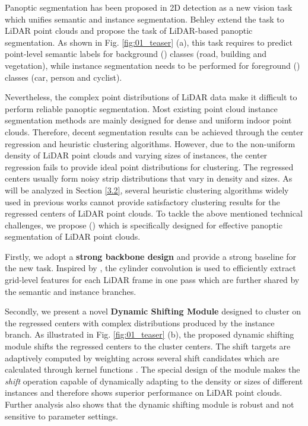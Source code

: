 \documentclass[final]{cvpr}
\begin{document}
Panoptic segmentation has been proposed in 2D detection \cite{kirillov2019panoptic} as a new vision task which unifies
semantic and instance segmentation.
Behley \etal \cite{behley2020benchmark} extend the task to LiDAR point clouds and propose the task of LiDAR-based panoptic segmentation.
As shown in Fig. \ref{fig:01_teaser} (a), this task requires to predict point-level semantic labels
for background (\stuff{}) classes (\eg road, building and vegetation),
while instance segmentation needs to be performed for foreground (\things{}) classes (\eg car, person and cyclist).

Nevertheless, the complex point distributions of LiDAR data make it difficult to perform reliable panoptic segmentation.
Most existing point cloud instance segmentation methods \cite{engelmann20203d, jiang2020pointgroup} are mainly designed for dense and uniform indoor point clouds.
Therefore, decent segmentation results can be achieved through the center regression and heuristic clustering algorithms.
However, due to the non-uniform density of LiDAR point clouds and varying sizes of instances,
the center regression fails to provide ideal point distributions for clustering.
The regressed centers usually form noisy strip distributions that vary in density and sizes.
As will be analyzed in Section \ref{3.2}, several heuristic clustering algorithms widely used in previous
works cannot provide satisfactory clustering results for the regressed centers of LiDAR point clouds.
To tackle the above mentioned technical challenges, we propose \fullname{} (\nickname{}) which is specifically designed for effective panoptic segmentation of LiDAR point clouds.

Firstly, we adopt a \textbf{strong backbone design} and provide a strong baseline for the new task.
Inspired by \cite{zhou2020cylinder3d}, the cylinder convolution is used
to efficiently extract grid-level features for each LiDAR frame in one pass which are further shared by the semantic and instance
branches.


Secondly, we present a novel \textbf{Dynamic Shifting Module} designed to cluster on the regressed centers with complex distributions
produced by the instance branch.
As illustrated in Fig. \ref{fig:01_teaser} (b), the proposed dynamic shifting module shifts the regressed centers to
the cluster centers.
The shift targets  are adaptively computed by weighting across several shift candidates  which are
calculated through kernel functions .
The special design of the module makes the \textit{shift} operation capable of dynamically adapting to the density or sizes of different
instances and therefore shows superior performance on LiDAR point clouds.
Further analysis also shows that the dynamic shifting module is robust and not sensitive to parameter settings.
\end{document}
